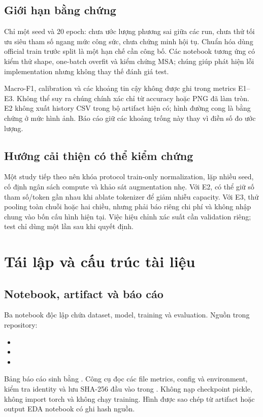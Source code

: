 \documentclass[11pt,a4paper]{article}
\begin{document}
\subsection{Giới hạn bằng chứng}
Chỉ một seed và 20 epoch: chưa ước lượng phương sai giữa các run, chưa thử tối ưu siêu tham số ngang mức công sức, chưa chứng minh hội tụ. Chuẩn hóa dùng official train trước split là một hạn chế cần công bố. Các notebook tương ứng có kiểm thử shape, one-batch overfit và kiểm chứng MSA; chúng giúp phát hiện lỗi implementation nhưng không thay thế đánh giá test.

Macro-F1, calibration và các khoảng tin cậy không được ghi trong metrics E1--E3. Không thể suy ra chúng chính xác chỉ từ accuracy hoặc PNG đã làm tròn. E2 không xuất history CSV trong bộ artifact hiện có; hình đường cong là bằng chứng ở mức hình ảnh. Báo cáo giữ các khoảng trống này thay vì điền số đo ước lượng.

\subsection{Hướng cải thiện có thể kiểm chứng}
Một study tiếp theo nên khóa protocol train-only normalization, lặp nhiều seed, cố định ngân sách compute và khảo sát augmentation nhẹ. Với E2, có thể giữ số tham số/token gần nhau khi ablate tokenizer để giảm nhiễu capacity. Với E3, thử pooling toàn chuỗi hoặc hai chiều, nhưng phải báo riêng chi phí và không nhập chung vào bốn cấu hình hiện tại. Việc hiệu chỉnh xác suất cần validation riêng; test chỉ dùng một lần sau khi quyết định.
\clearpage

\section{Tái lập và cấu trúc tài liệu}\label{sec:repro}
\subsection{Notebook, artifact và báo cáo}
Ba notebook độc lập chứa dataset, model, training và evaluation. Nguồn trong repository:
\begin{itemize}
\item {}
\item {}
\item {}
\end{itemize}
Bảng báo cáo sinh bằng . Công cụ đọc các file metrics, config và environment, kiểm tra identity và lưu SHA-256 đầu vào trong . Không nạp checkpoint pickle, không import torch và không chạy training. Hình được sao chép từ artifact hoặc output EDA notebook có ghi hash nguồn.
\end{document}
